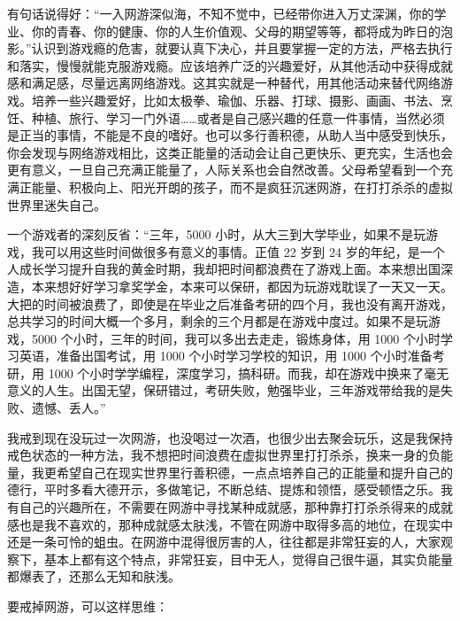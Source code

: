 有句话说得好：“一入网游深似海，不知不觉中，已经带你进入万丈深渊，你的学业、你的青春、你的健康、你的人生价值观、父母的期望等等，都将成为昨日的泡影。”认识到游戏瘾的危害，就要认真下决心，并且要掌握一定的方法，严格去执行和落实，慢慢就能克服游戏瘾。应该培养广泛的兴趣爱好，从其他活动中获得成就感和满足感，尽量远离网络游戏。这其实就是一种替代，用其他活动来替代网络游戏。培养一些兴趣爱好，比如太极拳、瑜伽、乐器、打球、摄影、画画、书法、烹饪、种植、旅行、学习一门外语……或者是自己感兴趣的任意一件事情，当然必须是正当的事情，不能是不良的嗜好。也可以多行善积德，从助人当中感受到快乐，你会发现与网络游戏相比，这类正能量的活动会让自己更快乐、更充实，生活也会更有意义，一旦自己充满正能量了，人际关系也会自然改善。父母希望看到一个充满正能量、积极向上、阳光开朗的孩子，而不是疯狂沉迷网游，在打打杀杀的虚拟世界里迷失自己。

一个游戏者的深刻反省：“三年，5000 小时，从大三到大学毕业，如果不是玩游戏，我可以用这些时间做很多有意义的事情。正值 22 岁到 24 岁的年纪，是一个人成长学习提升自我的黄金时期，我却把时间都浪费在了游戏上面。本来想出国深造，本来想好好学习拿奖学金，本来可以保研，都因为玩游戏耽误了一天又一天。大把的时间被浪费了，即使是在毕业之后准备考研的四个月，我也没有离开游戏，总共学习的时间大概一个多月，剩余的三个月都是在游戏中度过。如果不是玩游戏，5000 个小时，三年的时间，我可以多出去走走，锻炼身体，用 1000 个小时学习英语，准备出国考试，用 1000 个小时学习学校的知识，用 1000 个小时准备考研，用 1000 个小时学学编程，深度学习，搞科研。而我，却在游戏中换来了毫无意义的人生。出国无望，保研错过，考研失败，勉强毕业，三年游戏带给我的是失败、遗憾、丢人。”

我戒到现在没玩过一次网游，也没喝过一次酒，也很少出去聚会玩乐，这是我保持戒色状态的一种方法，我不想把时间浪费在虚拟世界里打打杀杀，换来一身的负能量，我更希望自己在现实世界里行善积德，一点点培养自己的正能量和提升自己的德行，平时多看大德开示，多做笔记，不断总结、提炼和领悟，感受顿悟之乐。我有自己的兴趣所在，不需要在网游中寻找某种成就感，那种靠打打杀杀得来的成就感也是我不喜欢的，那种成就感太肤浅，不管在网游中取得多高的地位，在现实中还是一条可怜的蛆虫。在网游中混得很厉害的人，往往都是非常狂妄的人，大家观察下，基本上都有这个特点，非常狂妄，目中无人，觉得自己很牛逼，其实负能量都爆表了，还那么无知和肤浅。

要戒掉网游，可以这样思维：

